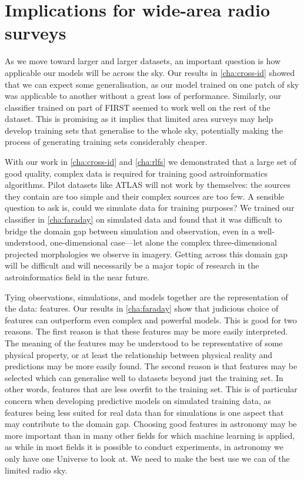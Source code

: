 \section{Implications for wide-area radio surveys}
\label{sec:implications-wide-area-radio-surveys}

    As we move toward larger and larger datasets, an important question is how applicable our models will be across the sky. Our results in \autoref{cha:cross-id} showed that we can expect some generalisation, as our model trained on one patch of sky was applicable to another without a great loss of performance. Similarly, our classifier trained on part of FIRST seemed to work well on the rest of the dataset. This is promising as it implies that limited area surveys may help develop training sets that generalise to the whole sky, potentially making the process of generating training sets considerably cheaper.

    With our work in \autoref{cha:cross-id} and \ref{cha:rlfs} we demonstrated that a large set of good quality, complex data is required for training good astroinformatics algorithms. Pilot datasets like ATLAS will not work by themselves: the sources they contain are too simple and their complex sources are too few. A sensible question to ask is, could we simulate data for training purposes? We trained our classifier in \autoref{cha:faraday} on simulated data and found that it was difficult to bridge the domain gap between simulation and observation, even in a well-understood, one-dimensional case---let alone the complex three-dimensional projected morphologies we observe in imagery. Getting across this domain gap will be difficult and will necessarily be a major topic of research in the astroinformatics field in the near future.

    Tying observations, simulations, and models together are the representation of the data: features. Our results in \autoref{cha:faraday} show that judicious choice of features can outperform even complex and powerful models. This is good for two reasons. The first reason is that these features may be more easily interpreted. The meaning of the features may be understood to be representative of some physical property, or at least the relationship between physical reality and predictions may be more easily found. The second reason is that features may be selected which can generalise well to datasets beyond just the training set. In other words, features that are less overfit to the training set. This is of particular concern when developing predictive models on simulated training data, as features being less suited for real data than for simulations is one aspect that may contribute to the domain gap. Choosing good features in astronomy may be more important than in many other fields for which machine learning is applied, as while in most fields it is possible to conduct experiments, in astronomy we only have one Universe to look at. We need to make the best use we can of the limited radio sky.

